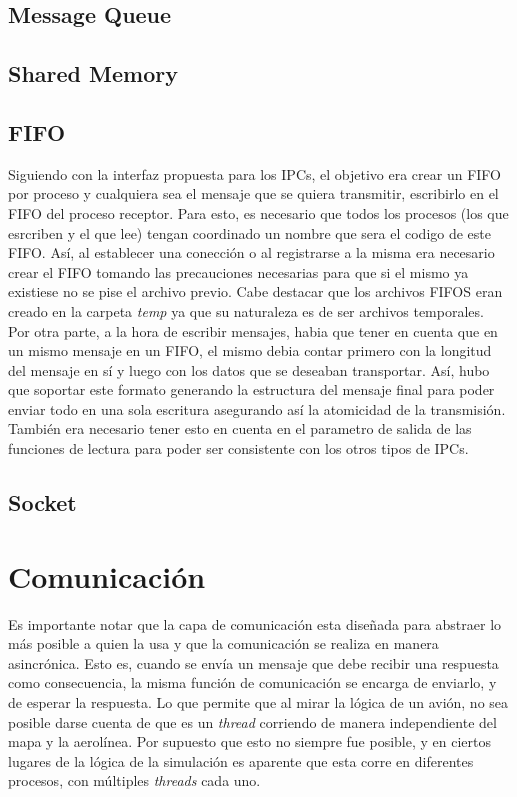 \documentclass[a4paper,10pt]{article}
\begin{document}
\subsection{Message Queue}

\subsection{Shared Memory}

\subsection{FIFO}
Siguiendo con la interfaz propuesta para los IPCs, el objetivo era crear un FIFO por proceso y cualquiera sea el
mensaje que se quiera transmitir, escribirlo en el FIFO del proceso receptor. Para esto, es necesario que todos los
procesos (los que esrcriben y el que lee) tengan coordinado un nombre que sera el codigo de este FIFO. Así,
al establecer una conección o al registrarse a la misma era necesario crear el FIFO tomando las precauciones necesarias
para que si el mismo ya existiese no se pise el archivo previo. Cabe destacar que los archivos FIFOS eran creado en
la carpeta \textit{temp} ya que su naturaleza es de ser archivos temporales. \\

Por otra parte, a la hora de escribir mensajes, habia que tener en cuenta que en un mismo mensaje en un FIFO, el mismo
debia contar primero con la longitud del mensaje en sí y luego con los datos que se deseaban transportar. Así, hubo
que soportar este formato generando la estructura del mensaje final para poder enviar todo en una sola escritura
asegurando así la atomicidad de la transmisión. También era necesario tener esto en cuenta en el parametro de salida 
de las funciones de lectura para poder ser consistente con los otros tipos de IPCs.
\subsection{Socket}

\newpage
\section{Comunicación}
Es importante notar que la capa de comunicación esta diseñada para abstraer lo más posible a quien la usa y que la comunicación se realiza en manera asincrónica.
Esto es, cuando se envía un mensaje que debe recibir una respuesta como consecuencia, la misma función de comunicación se encarga de enviarlo, y de esperar 
la respuesta. Lo que permite que al mirar la lógica de un avión, no sea posible darse cuenta de que es un \textit{thread} corriendo de manera independiente del mapa y
 la aerolínea. Por supuesto que esto no siempre fue posible, y en ciertos lugares de la lógica de la simulación es aparente que esta corre en diferentes procesos,
 con múltiples \textit{threads} cada uno.
\end{document}
